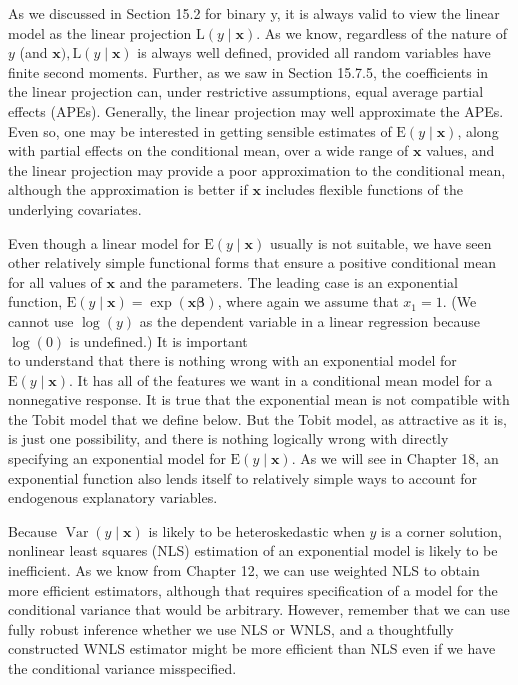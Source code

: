 \documentclass[10pt]{article}
\begin{document}
As we discussed in Section 15.2 for binary y, it is always valid to view the linear model as the linear projection $\mathrm{L}(y \mid \mathbf{x})$. As we know, regardless of the nature of $y$ (and $\mathbf{x}), \mathrm{L}(y \mid \mathbf{x})$ is always well defined, provided all random variables have finite second moments. Further, as we saw in Section 15.7.5, the coefficients in the linear projection can, under restrictive assumptions, equal average partial effects (APEs). Generally, the linear projection may well approximate the APEs. Even so, one may be interested in getting sensible estimates of $\mathrm{E}(y \mid \mathbf{x})$, along with partial effects on the conditional mean, over a wide range of $\mathbf{x}$ values, and the linear projection may provide a poor approximation to the conditional mean, although the approximation is better if $\mathbf{x}$ includes flexible functions of the underlying covariates.

Even though a linear model for $\mathrm{E}(y \mid \mathbf{x})$ usually is not suitable, we have seen other relatively simple functional forms that ensure a positive conditional mean for all values of $\mathbf{x}$ and the parameters. The leading case is an exponential function, $\mathrm{E}(y \mid \mathbf{x})=\exp (\mathbf{x} \boldsymbol{\beta})$, where again we assume that $x_{1}=1$. (We cannot use $\log (y)$ as the dependent variable in a linear regression because $\log (0)$ is undefined.) It is important\\
to understand that there is nothing wrong with an exponential model for $\mathrm{E}(y \mid \mathbf{x})$. It has all of the features we want in a conditional mean model for a nonnegative response. It is true that the exponential mean is not compatible with the Tobit model that we define below. But the Tobit model, as attractive as it is, is just one possibility, and there is nothing logically wrong with directly specifying an exponential model for $\mathrm{E}(y \mid \mathbf{x})$. As we will see in Chapter 18, an exponential function also lends itself to relatively simple ways to account for endogenous explanatory variables.

Because $\operatorname{Var}(y \mid \mathbf{x})$ is likely to be heteroskedastic when $y$ is a corner solution, nonlinear least squares (NLS) estimation of an exponential model is likely to be inefficient. As we know from Chapter 12, we can use weighted NLS to obtain more efficient estimators, although that requires specification of a model for the conditional variance that would be arbitrary. However, remember that we can use fully robust inference whether we use NLS or WNLS, and a thoughtfully constructed WNLS estimator might be more efficient than NLS even if we have the conditional variance misspecified.
\end{document}
